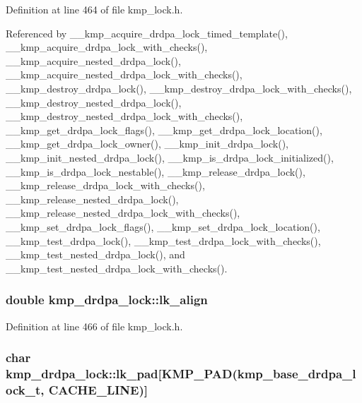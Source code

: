 Definition at line 464 of file kmp\-\_\-lock.\-h.



Referenced by \-\_\-\-\_\-kmp\-\_\-acquire\-\_\-drdpa\-\_\-lock\-\_\-timed\-\_\-template(), \-\_\-\-\_\-kmp\-\_\-acquire\-\_\-drdpa\-\_\-lock\-\_\-with\-\_\-checks(), \-\_\-\-\_\-kmp\-\_\-acquire\-\_\-nested\-\_\-drdpa\-\_\-lock(), \-\_\-\-\_\-kmp\-\_\-acquire\-\_\-nested\-\_\-drdpa\-\_\-lock\-\_\-with\-\_\-checks(), \-\_\-\-\_\-kmp\-\_\-destroy\-\_\-drdpa\-\_\-lock(), \-\_\-\-\_\-kmp\-\_\-destroy\-\_\-drdpa\-\_\-lock\-\_\-with\-\_\-checks(), \-\_\-\-\_\-kmp\-\_\-destroy\-\_\-nested\-\_\-drdpa\-\_\-lock(), \-\_\-\-\_\-kmp\-\_\-destroy\-\_\-nested\-\_\-drdpa\-\_\-lock\-\_\-with\-\_\-checks(), \-\_\-\-\_\-kmp\-\_\-get\-\_\-drdpa\-\_\-lock\-\_\-flags(), \-\_\-\-\_\-kmp\-\_\-get\-\_\-drdpa\-\_\-lock\-\_\-location(), \-\_\-\-\_\-kmp\-\_\-get\-\_\-drdpa\-\_\-lock\-\_\-owner(), \-\_\-\-\_\-kmp\-\_\-init\-\_\-drdpa\-\_\-lock(), \-\_\-\-\_\-kmp\-\_\-init\-\_\-nested\-\_\-drdpa\-\_\-lock(), \-\_\-\-\_\-kmp\-\_\-is\-\_\-drdpa\-\_\-lock\-\_\-initialized(), \-\_\-\-\_\-kmp\-\_\-is\-\_\-drdpa\-\_\-lock\-\_\-nestable(), \-\_\-\-\_\-kmp\-\_\-release\-\_\-drdpa\-\_\-lock(), \-\_\-\-\_\-kmp\-\_\-release\-\_\-drdpa\-\_\-lock\-\_\-with\-\_\-checks(), \-\_\-\-\_\-kmp\-\_\-release\-\_\-nested\-\_\-drdpa\-\_\-lock(), \-\_\-\-\_\-kmp\-\_\-release\-\_\-nested\-\_\-drdpa\-\_\-lock\-\_\-with\-\_\-checks(), \-\_\-\-\_\-kmp\-\_\-set\-\_\-drdpa\-\_\-lock\-\_\-flags(), \-\_\-\-\_\-kmp\-\_\-set\-\_\-drdpa\-\_\-lock\-\_\-location(), \-\_\-\-\_\-kmp\-\_\-test\-\_\-drdpa\-\_\-lock(), \-\_\-\-\_\-kmp\-\_\-test\-\_\-drdpa\-\_\-lock\-\_\-with\-\_\-checks(), \-\_\-\-\_\-kmp\-\_\-test\-\_\-nested\-\_\-drdpa\-\_\-lock(), and \-\_\-\-\_\-kmp\-\_\-test\-\_\-nested\-\_\-drdpa\-\_\-lock\-\_\-with\-\_\-checks().

\hypertarget{unionkmp__drdpa__lock_aa8f648eeb23488e65584493fc61d3e40}{
\subsubsection[{lk\-\_\-align}]{\setlength{\rightskip}{0pt plus 5cm}double kmp\-\_\-drdpa\-\_\-lock\-::lk\-\_\-align}}\label{unionkmp__drdpa__lock_aa8f648eeb23488e65584493fc61d3e40}


Definition at line 466 of file kmp\-\_\-lock.\-h.

\hypertarget{unionkmp__drdpa__lock_a21b5a652cc362cd7fb336ca7055fe289}{
\subsubsection[{lk\-\_\-pad}]{\setlength{\rightskip}{0pt plus 5cm}char kmp\-\_\-drdpa\-\_\-lock\-::lk\-\_\-pad\mbox{[}{\bf K\-M\-P\-\_\-\-P\-A\-D}({\bf kmp\-\_\-base\-\_\-drdpa\-\_\-lock\-\_\-t}, {\bf C\-A\-C\-H\-E\-\_\-\-L\-I\-N\-E})\mbox{]}}}\label{unionkmp__drdpa__lock_a21b5a652cc362cd7fb336ca7055fe289}


